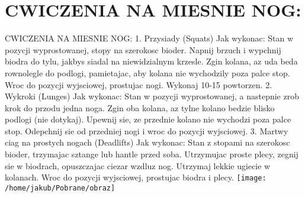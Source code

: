 \documentclass{beamer}
\begin{document}
\section{CWICZENIA NA MIESNIE NOG:}
\begin{frame}{CWICZENIA NA MIESNIE NOG:}
1. Przysiady (Squats)
Jak wykonac:
Stan w pozycji wyprostowanej, stopy na szerokosc bioder.
Napnij brzuch i wypchnij biodra do tylu, jakbys siadal na niewidzialnym krzesle.
Zgin kolana, az uda beda rownolegle do podlogi, pamietajac, aby kolana nie wychodzily poza palce stop.
Wroc do pozycji wyjsciowej, prostujac nogi.
Wykonaj 10-15 powtorzen.
2. Wykroki (Lunges)
Jak wykonac:
Stan w pozycji wyprostowanej, a nastepnie zrob krok do przodu jedna noga.
Zgin oba kolana, az tylne kolano bedzie blisko podlogi (nie dotykaj).
Upewnij sie, ze przednie kolano nie wychodzi poza palce stop.
Odepchnij sie od przedniej nogi i wroc do pozycji wyjsciowej.
3. Martwy ciag na prostych nogach (Deadlifts)
Jak wykonac:
Stan z stopami na szerokosc bioder, trzymajac sztange lub hantle przed soba.
Utrzymujac proste plecy, zegnij sie w biodrach, opuszczajac ciezar wzdluz nog.
Utrzymaj lekkie ugiecie w kolanach.
Wroc do pozycji wyjsciowej, prostujac biodra i plecy.
\texttt{[image: /home/jakub/Pobrane/obraz]}
\end{frame}
\end{document}
